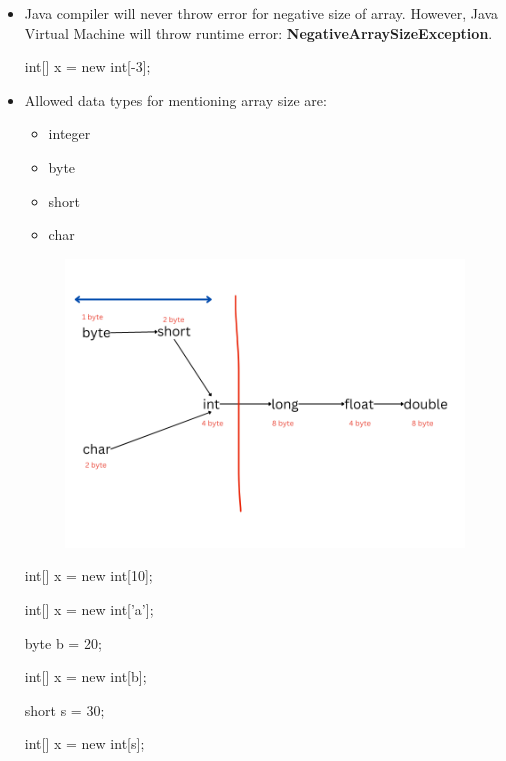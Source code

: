 \begin{flushleft}
\begin{itemize}
\begin{itemize}
			\item Java compiler will never throw error for negative size of array. However, Java Virtual Machine will throw runtime error: \textbf{NegativeArraySizeException}.
			\begin{tcolorbox}[breakable,notitle,boxrule=-0pt,colback=code,colframe=code]
				\color{black}
				\font=8pt
				int[] x = new int[-3]; \xmark
				\font=4pt
			\end{tcolorbox}
			
			\item Allowed data types for mentioning array size are:
			\begin{itemize}
				\item integer
				\item byte
				\item short
				\item char
			\end{itemize}
			
			\begin{figure}[h!]
				\centering
				\includegraphics[scale=.45]{content/chapter4/images/allow.png}
			\end{figure}	
			
			\begin{tcolorbox}[breakable,notitle,boxrule=-0pt,colback=code,colframe=code]
				\color{black}
				\font=8pt
				int[] x = new int[10]; \cmark \par
				int[] x = new int['a']; \cmark \par
				byte b = 20; \par
				int[] x = new int[b]; \cmark \par
				short s = 30; \par
				int[] x = new int[s]; \cmark \par
				\font=4pt
			\end{tcolorbox}
			

\end{itemize}
\end{itemize}
\end{flushleft}
